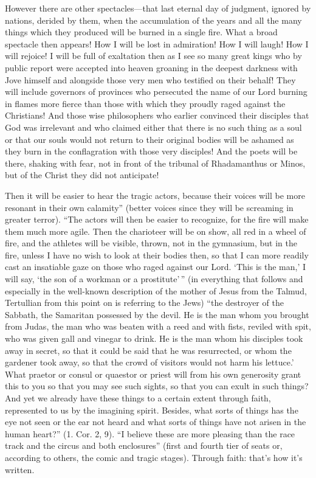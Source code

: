 \begin{quotationx}
However there are other spectacles---that last eternal day of judgment, ignored by nations, derided by them, when the accumulation of the years and all the many things which they produced will be burned in a single fire. What a broad spectacle then appears! How I will be lost in admiration! How I will laugh! How I will rejoice! I will be full of exaltation then as I see so many great kings who by public report were accepted into heaven groaning in the deepest darkness with Jove himself and alongside those very men who testified on their behalf! They will include governors of provinces who persecuted the name of our Lord burning in flames more fierce than those with which they proudly raged against the Christians! And those wise philosophers who earlier convinced their disciples that God was irrelevant and who claimed either that there is no such thing as a soul or that our souls would not return to their original bodies will be ashamed as they burn in the conflagration with those very disciples! And the poets will be there, shaking with fear, not in front of the tribunal of Rhadamanthus or Minos, but of the Christ they did not anticipate!

Then it will be easier to hear the tragic actors, because their voices will be more resonant in their own calamity'' (better voices since they will be screaming in greater terror). ``The actors will then be easier to recognize, for the fire will make them much more agile. Then the charioteer will be on show, all red in a wheel of fire, and the athletes will be visible, thrown, not in the gymnasium, but in the fire, unless I have no wish to look at their bodies then, so that I can more readily cast an insatiable gaze on those who raged against our Lord. `This is the man,' I will say, `the son of a workman or a prostitute'\,'' (in everything that follows and especially in the well-known description of the mother of Jesus from the Talmud, Tertullian from this point on is referring to the Jews) ``the destroyer of the Sabbath, the Samaritan possessed by the devil. He is the man whom you brought from Judas, the man who was beaten with a reed and with fists, reviled with spit, who was given gall and vinegar to drink. He is the man whom his disciples took away in secret, so that it could be said that he was resurrected, or whom the gardener took away, so that the crowd of visitors would not harm his lettuce.' What praetor or consul or quaestor or priest will from his own generosity grant this to you so that you may see such sights, so that you can exult in such things? And yet we already have these things to a certain extent through faith, represented to us by the imagining spirit. Besides, what sorts of things has the eye not seen or the ear not heard and what sorts of things have not arisen in the human heart?'' (1. Cor. 2, 9). ``I believe these are more pleasing than the race track and the circus and both enclosures'' (first and fourth tier of seats or, according to others, the comic and tragic stages). Through faith: that's how it's written.
\end{quotationx}



